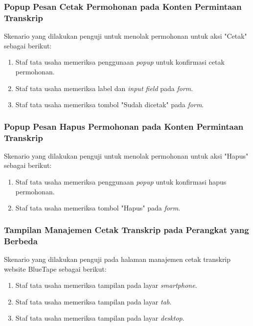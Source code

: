 \subsubsection{Popup Pesan Cetak Permohonan pada Konten Permintaan Transkrip}
Skenario yang dilakukan penguji untuk menolak permohonan untuk aksi "Cetak" sebagai berikut:
\begin{enumerate}
	\item Staf tata usaha memeriksa penggunaan \textit{popup} untuk konfirmasi cetak permohonan.
	\item Staf tata usaha memeriksa label dan \textit{input field} pada \textit{form}.
	\item Staf tata usaha memeriksa tombol "Sudah dicetak" pada \textit{form}.	
\end{enumerate}

\subsubsection{Popup Pesan Hapus Permohonan pada Konten Permintaan Transkrip}
Skenario yang dilakukan penguji untuk menolak permohonan untuk aksi "Hapus" sebagai berikut:
\begin{enumerate}
	\item Staf tata usaha memeriksa penggunaan \textit{popup} untuk konfirmasi hapus permohonan.
	\item Staf tata usaha memeriksa tombol "Hapus" pada \textit{form}.	
\end{enumerate}

\subsubsection{Tampilan Manajemen Cetak Transkrip pada Perangkat yang Berbeda}
Skenario yang dilakukan penguji pada halaman manajemen cetak transkrip website BlueTape sebagai berikut:
\begin{enumerate}
	\item Staf tata usaha memeriksa tampilan pada layar \textit{smartphone}. 	
	\item Staf tata usaha memeriksa tampilan pada layar \textit{tab}.
	\item Staf tata usaha memeriksa tampilan pada layar \textit{desktop}.
\end{enumerate}

